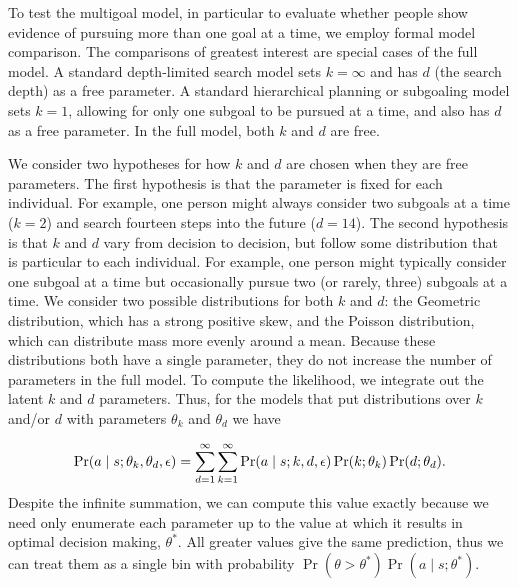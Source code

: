 \documentclass[10pt,letterpaper]{article}
\begin{document}
To test the multigoal model, in particular to evaluate whether people show evidence of pursuing more than one goal at a time, we employ formal model comparison. The comparisons of greatest interest are special cases of the full model. A standard depth-limited search model sets $k=\infty$ and has $d$ (the search depth) as a free parameter. A standard hierarchical planning or subgoaling model sets $k=1$, allowing for only one subgoal to be pursued at a time, and also has $d$ as a free parameter. In the full model, both $k$ and $d$ are free.

We consider two hypotheses for how $k$ and $d$ are chosen when they are free parameters. The first hypothesis is that the parameter is fixed for each individual. For example, one person might always consider two subgoals at a time ($k=2$)  and search fourteen steps into the future ($d=14$). The second hypothesis is that $k$ and $d$ vary from decision to decision, but follow some distribution that is particular to each individual. For example, one person might typically consider one subgoal at a time but occasionally pursue two (or rarely, three) subgoals at a time. We consider two possible distributions for both $k$ and $d$: the Geometric distribution, which has a strong positive skew, and the Poisson distribution, which can distribute mass more evenly around a mean. Because these distributions both have a single parameter, they do not increase the number of parameters in the full model. To compute the likelihood, we integrate out the latent $k$ and $d$ parameters. Thus, for the models that put distributions over $k$ and/or $d$ with parameters $\theta_k$ and $\theta_d$ we have
%
%

\begin{equation}\label{eq:likelihood-dist}
  \Pr(a \mid s; \theta_k, \theta_d, \epsilon) = 
    \sum_{d=1}^{\infty} \sum_{k=1}^{\infty}
      \Pr(a \mid s; k, d, \epsilon) \Pr(k ; \theta_k) \Pr(d ; \theta_d) \\
.
\end{equation}
Despite the infinite summation, we can compute this value exactly because we need only enumerate each parameter up to the value at which it results in optimal decision making, $\theta^*$. All greater values give the same prediction, thus we can treat them as a single bin with probability $\Pr(\theta > \theta^*) \Pr(a \mid s; \theta^*)$.
\end{document}
